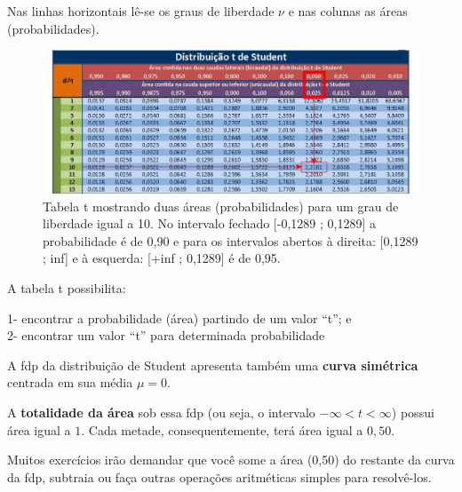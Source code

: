 \documentclass[
]{book}
\begin{document}
Nas linhas horizontais lê-se os graus de liberdade \(\nu\) e nas colunas as áreas (probabilidades).

\hfill\break

\begin{figure}

{\centering \includegraphics[width=1\linewidth]{images6/tabta} 

}

\caption{Tabela t mostrando duas áreas (probabilidades) para um grau de liberdade igual a 10. No intervalo fechado [-0,1289 ; 0,1289] a probabilidade é de 0,90 e para os intervalos abertos à direita: [0,1289 ; inf] e  à esquerda: [+inf ; 0,1289] é de 0,95.}\label{fig:fig26}
\end{figure}

\hfill\break

A tabela t possibilita:

\hfill\break

1- encontrar a probabilidade (área) partindo de um valor ``t''; e\\
2- encontrar um valor ``t'' para determinada probabilidade

\hfill\break

A fdp da distribuição de Student apresenta também uma \textbf{curva simétrica} centrada em sua média \(\mu=0\).

\hfill\break

A \textbf{totalidade da área} sob essa fdp (ou seja, o intervalo \(-\infty < t < \infty\)) possui área igual a \(1\). Cada metade, consequentemente, terá área igual a \(0,50\).

\hfill\break

Muitos exercícios irão demandar que você some a área (0,50) do restante da curva da fdp, subtraia ou faça outras operações aritméticas simples para resolvê-los.
\end{document}
